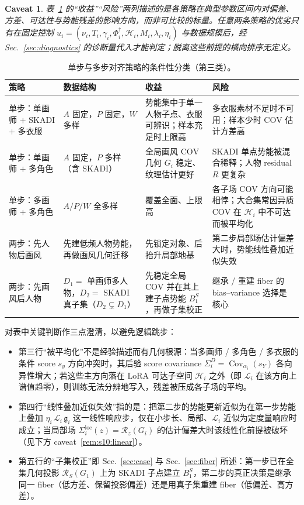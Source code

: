 \documentclass[11pt,a4paper]{article}
\newtheorem{caveat}[theorem]{Caveat}
\DeclareMathOperator{\Cov}{Cov}
\newcommand{\cH}{\mathcal{H}}   %
\newcommand{\cL}{\mathcal{L}}   %
\newcommand{\Rstr}{\mathcal{R}}     %
\newcommand{\COV}{\mathrm{COV}}     %
\newcommand{\gres}{\bm{\mathfrak{g}}} %
\begin{document}
\begin{caveat}\label{rem:s10:nonorder}
表~\ref{tab:s10:strategies} 的“收益”“风险”两列描述的是各策略在\emph{典型参数区间}内对偏差、方差、可达性与势能残差的影响方向，而非可比较的标量。任意两条策略的优劣只有在固定控制 $u_i=(\nu_i,T_i,\gamma_i,\Phi_i^\dagger,\cH_i,M_i,\lambda_i,\eta_i)$ 与数据规模后，经 Sec.~\ref{sec:diagnostics} 的诊断量代入才能判定；脱离这些前提的横向排序无定义。
\end{caveat}

\begin{table}[htbp]
\centering
\caption{单步与多步对齐策略的条件性分类（第三类）。}\label{tab:s10:strategies}
\small
\begin{tabular}{@{}p{}p{}p{}p{}@{}}
\toprule
\textbf{策略} & \textbf{数据结构} & \textbf{收益} & \textbf{风险} \\
\midrule
单步：单画师 $+$ SKADI $+$ 多衣服
& $A$ 固定，$P$ 固定，$W$ 多样
& 势能集中于单一人物子点、衣服可辨识；样本充足时上限高
& 多衣服素材不足时不可用；样本少时 $\COV$ 估计方差高 \\
\addlinespace
单步：单画师 $+$ 多角色
& $A$ 固定，$P$ 多样（含 SKADI）
& 全局画风 $\COV$ 几何 $G_i$ 稳定、纹理估计更好
& SKADI 单点势能被混合稀释；人物 residual $R$ 更复杂 \\
\addlinespace
单步：多画师 $+$ 多角色
& $A/P/W$ 全多样
& 覆盖全面、上限高
& 各子场 $\COV$ 方向可能相悖；大合集常因异质 $\COV$ 在 $\cH_i$ 中不可达而被平均化 \\
\addlinespace
两步：先人物后画风
& 先建低频人物势能，再做画风几何迁移
& 先锁定对象、后抬升局部地基
& 第二步局部场估计偏差大时，势能线性叠加近似失效 \\
\addlinespace
两步：先画风后人物
& $D_1=$ 单画师多人物，$D_2=$ SKADI 真子集（$D_2\subsetneq D_1$）
& 先稳定全局 $\COV$ 并在其上建子点势能 $B_1^S$，再做子集校正
& 继承 / 重建 fiber 的 bias--variance 选择是核心 \\
\bottomrule
\end{tabular}
\end{table}

对表中关键判断作三点澄清，以避免逻辑跳步：

\begin{itemize}
  \item 第三行“被平均化”不是经验描述而有几何根源：当多画师 / 多角色 / 多衣服的条件 score $s_y$ 方向冲突时，其后验 score covariance $\Sigma_i^D=\Cov_{\alpha_i}(s_Y)$ 各向异性增大；若这些主方向落在 LoRA 可达子空间 $\cH_i$ 之外（即 $\cL_i$ 在该方向上谱值趋零），则训练无法分辨地写入，残差被压成各子场的平均。
  \item 第四行“线性叠加近似失效”指的是：把第二步的势能更新近似为在第一步势能上叠加 $\eta_i\,\cL_i\,\gres_i$ 这一线性响应步，仅在小步长、局部、$\cL_i$ 近似为定度量响应时成立；当局部场 $\Sigma_i^{\mathrm{loc}}(z)=\Rstr_z(G_i)$ 的估计偏差大时该线性化前提被破坏（见下方 caveat~\ref{rem:s10:linear}）。
  \item 第五行的“子集校正”即 Sec.~\ref{sec:case} 与 Sec.~\ref{sec:fiber} 所述：第一步已在全集几何投影 $\Rstr_S(G_1)$ 上为 SKADI 子点建立 $B_1^S$，第二步的真正决策是继承同一 fiber（低方差、保留投影偏差）还是用真子集重建 fiber（低偏差、高方差）。
\end{itemize}
\end{document}
